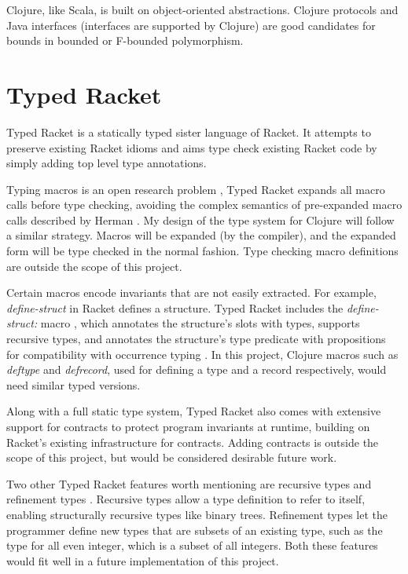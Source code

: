 \documentclass[12pt, a4paper]{article}
\begin{document}
Clojure, like Scala, is built on object-oriented abstractions. Clojure protocols
and Java interfaces (interfaces are supported by Clojure) are good candidates
for bounds in bounded or F-bounded polymorphism.

\section{Typed Racket}

Typed Racket is a statically typed sister language of Racket. It
attempts to preserve existing Racket idioms and aims type check
existing Racket code by simply adding top level type annotations. \cite{SAMTH:dissertation}

Typing macros is an open research problem \cite{Herman10:Theory},
Typed Racket expands all macro calls before type checking, \cite{SAMTH:dissertation}
avoiding the complex semantics of pre-expanded macro calls described by Herman 
\cite{Herman10:Theory} .
My design of the type system for Clojure will follow a similar strategy. Macros
will be expanded (by the compiler), and the expanded form will be type checked in
the normal fashion. Type checking macro definitions are outside the scope of this project.

Certain macros encode invariants that are not easily extracted. For example,
\emph{define-struct} in Racket defines a structure. Typed Racket includes the
\emph{define-struct:} macro \cite{Tobin-Hochstadt:2008:DIT:1328897.1328486}
, which annotates the structure's slots with types,
supports recursive types, and annotates the structure's type predicate with propositions
for compatibility with occurrence typing \cite{Strickland:2009:PVP:1532974.1532978}.
In this project, Clojure macros such as \emph{deftype} and \emph{defrecord}, used for defining a type
and a record respectively, would need similar typed versions.

Along with a full static type system, Typed Racket also comes with extensive support for
contracts to protect program invariants at runtime, \cite{Tobin-Hochstadt:2008:DIT:1328897.1328486}
building on Racket's existing infrastructure for contracts.
Adding contracts is outside the scope of this project, but would be considered desirable
future work.

Two other Typed Racket features worth mentioning are recursive types and refinement types  
\cite{SAMTH:dissertation}
.
Recursive types allow a type definition to refer to itself, enabling structurally
recursive types like binary trees. Refinement types let the programmer define
new types that are subsets of an existing type, such as the type for all even integer,
which is a subset of all integers.
Both these features would fit well in a future implementation of this project.
\end{document}
